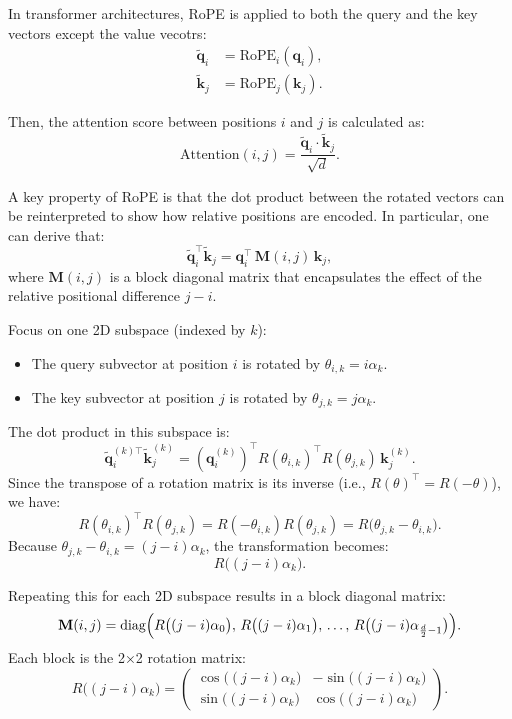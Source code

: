 In transformer architectures, RoPE is applied to both the query and the key vectors except the value vecotrs:
\[
\begin{aligned}
\tilde{\mathbf{q}}_i &= \text{RoPE}_i(\mathbf{q}_i), \\
\tilde{\mathbf{k}}_j &= \text{RoPE}_j(\mathbf{k}_j).
\end{aligned}
\]

Then, the attention score between positions \(i\) and \(j\) is calculated as:
\[
\text{Attention}(i, j) = \frac{\tilde{\mathbf{q}}_i \cdot \tilde{\mathbf{k}}_j}{\sqrt{d}}.
\]

A key property of RoPE is that the dot product between the rotated vectors can be reinterpreted to show how relative positions are encoded. In particular, one can derive that:
\[
\tilde{\mathbf{q}}_i^\top \tilde{\mathbf{k}}_j = \mathbf{q}_i^\top\, \mathbf{M}(i,j)\, \mathbf{k}_j,
\]
where \(\mathbf{M}(i,j)\) is a block diagonal matrix that encapsulates the effect of the relative positional difference \(j-i\).

Focus on one 2D subspace (indexed by \(k\)):
\begin{itemize}
	\item The query subvector at position \(i\) is rotated by \(\theta_{i,k} = i\alpha_k\).
	\item The key subvector at position \(j\) is rotated by \(\theta_{j,k} = j\alpha_k\).
\end{itemize}

The dot product in this subspace is:
\[
\tilde{\mathbf{q}}_i^{(k)\top} \tilde{\mathbf{k}}_j^{(k)} 
= \left(\mathbf{q}_i^{(k)}\right)^\top R(\theta_{i,k})^\top R(\theta_{j,k}) \, \mathbf{k}_j^{(k)}.
\]
Since the transpose of a rotation matrix is its inverse (i.e., \(R(\theta)^\top = R(-\theta)\)), we have:
\[
R(\theta_{i,k})^\top R(\theta_{j,k}) = R(-\theta_{i,k})R(\theta_{j,k}) = R\bigl(\theta_{j,k} - \theta_{i,k}\bigr).
\]
Because \(\theta_{j,k} - \theta_{i,k} = (j-i)\alpha_k\), the transformation becomes:
\[
R\bigl((j-i)\alpha_k\bigr).
\]

Repeating this for each 2D subspace results in a block diagonal matrix:
\[
\mathbf{M}(i,j) = \text{diag}\Bigl(
R\bigl((j-i)\alpha_0\bigr),\,
R\bigl((j-i)\alpha_1\bigr),\,
\ldots,\,
R\bigl((j-i)\alpha_{\frac{d}{2}-1}\bigr)
\Bigr).
\]
Each block is the 2×2 rotation matrix:
\[
R\bigl((j-i)\alpha_k\bigr)
= \begin{pmatrix}
\cos\bigl((j-i)\alpha_k\bigr) & -\sin\bigl((j-i)\alpha_k\bigr) \\
\sin\bigl((j-i)\alpha_k\bigr) & \cos\bigl((j-i)\alpha_k\bigr)
\end{pmatrix}.
\]


